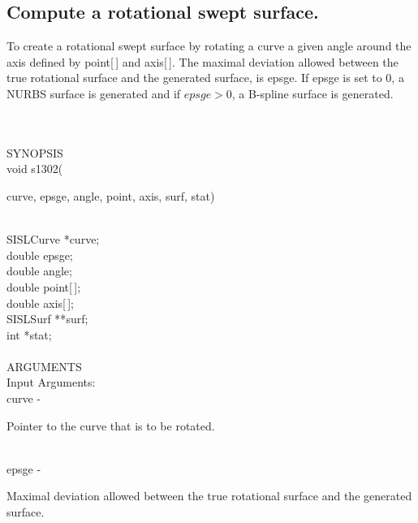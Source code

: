 \subsection{Compute a rotational swept surface.}
\begin{minipg1}
  To create a rotational swept surface by rotating a curve
  a given angle around the axis defined by {\fov point}[\,] and
  {\fov axis}[\,].
  The maximal deviation allowed between the true rotational surface and the
  generated surface, is {\fov epsge}.
  If {\fov epsge} is set to 0, a NURBS surface is generated and if
  $epsge >0$, a B-spline surface is generated.
\end{minipg1} \\ \\
SYNOPSIS\\
        \>void s1302(\begin{minipg3}
                        {\fov curve}, {\fov epsge}, {\fov angle}, {\fov point}, {\fov axis}, {\fov surf}, {\fov stat})
                \end{minipg3}\\[0.3ex]
                \>\>    SISLCurve       \>      *{\fov curve};\\
                \>\>    double  \>      {\fov epsge};\\
                \>\>    double  \>      {\fov angle};\\
                \>\>    double  \>      {\fov point}[\,];\\
                \>\>    double  \>      {\fov axis}[\,];\\
                \>\>    SISLSurf        \>      **{\fov surf};\\
                \>\>    int     \>      *{\fov stat};\\
\\
ARGUMENTS\\
        \>Input Arguments:\\
        \>\>    {\fov curve}    \> - \> \begin{minipg2}
                                Pointer to the curve that is to be rotated.
                                \end{minipg2}\\
        \>\>    {\fov epsge}    \> - \> \begin{minipg2}
                                Maximal deviation allowed between the true rotational
                                surface and the generated surface.
                                \end{minipg2}\\[0.3ex]
